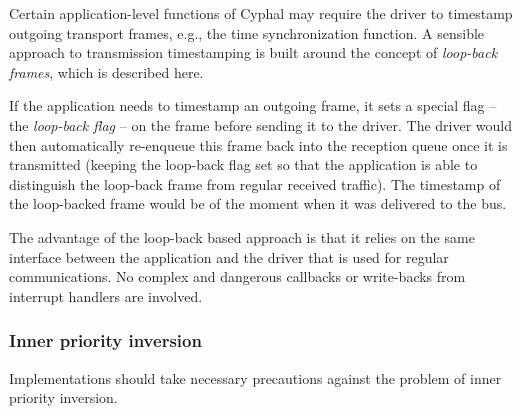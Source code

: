 \begin{remark}[breakable]
    Certain application-level functions of Cyphal may require the driver to timestamp outgoing transport frames,
    e.g., the time synchronization function.
    A sensible approach to transmission timestamping is built around the concept of \emph{loop-back frames},
    which is described here.

    If the application needs to timestamp an outgoing frame, it sets a special flag -- the \emph{loop-back flag} --
    on the frame before sending it to the driver.
    The driver would then automatically re-enqueue this frame back into the reception queue once it is transmitted
    (keeping the loop-back flag set so that the application is able to distinguish the loop-back
    frame from regular received traffic).
    The timestamp of the loop-backed frame would be of the moment when it was delivered to the bus.

    The advantage of the loop-back based approach is that it relies on the same interface between
    the application and the driver that is used for regular communications.
    No complex and dangerous callbacks or write-backs from interrupt handlers are involved.
\end{remark}

\subsubsection{Inner priority inversion}

Implementations should take necessary precautions against the problem of inner priority inversion.

